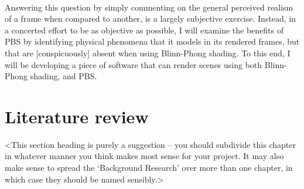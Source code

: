 \paragraph{}Answering this question by simply commenting on the general perceived realism of a frame when compared to another, is a largely subjective exercise. Instead, in a concerted effort to be as objective as possible, I will examine the benefits of PBS by identifying physical phenomena that it models in its rendered frames, but that are [conspicuously] absent when using Blinn-Phong shading. To this end, I will be developing a piece of software that can render scenes using both Blinn-Phong shading, and PBS.


\section{Literature review}
<This section heading is purely a suggestion -- you should subdivide this chapter in whatever manner you think makes most sense for your project. It may also make sense to spread the `Background Research' over more than one chapter, in which case they should be named sensibly.>

